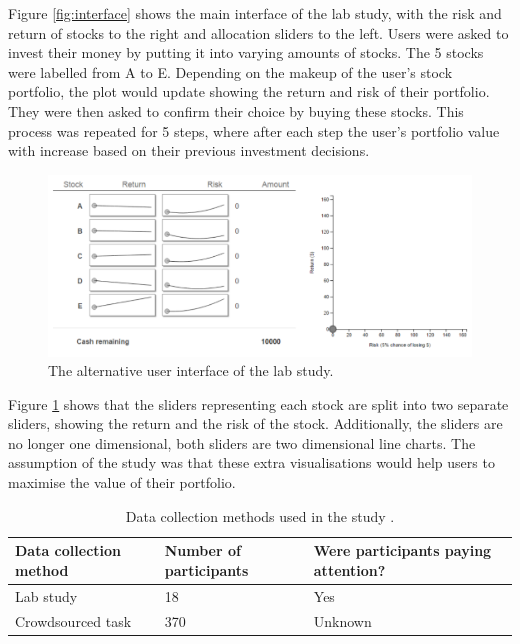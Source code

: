 \documentclass{article}
\begin{document}
Figure \ref{fig:interface} shows the main interface of the lab study, with the risk and return of stocks to the right and allocation sliders to the left.
Users were asked to invest their money by putting it into varying amounts of stocks.
The 5 stocks were labelled from A to E.
Depending on the makeup of the user's stock portfolio, the plot would update showing the return and risk of their portfolio.
They were then asked to confirm their choice by buying these stocks.
This process was repeated for 5 steps, where after each step the user's portfolio value with increase based on their previous investment decisions. 

\begin{figure}[ht]
    \centering
    \includegraphics[scale=0.45, frame]{Images/interfaceSA.png}
    \caption{The alternative user interface of the lab study.}
    \label{fig:interfaceSA}
\end{figure}

Figure \ref{fig:interfaceSA} shows that the sliders representing each stock are split into two separate sliders, showing the return and the risk of the stock.
Additionally, the sliders are no longer one dimensional, both sliders are two dimensional line charts.
The assumption of the study was that these extra visualisations would help users to maximise the value of their portfolio.

\begin{table}[ht]
    \caption{\label{table:studies} Data collection methods used in the study \cite{gruber2017thesis}.}
    \small
    \begin{tabular}{lll}
        \hline
        Data collection method & Number of participants & Were participants paying attention? \\    \hline
        Lab study              & 18                     & Yes                                 \\
        Crowdsourced task      & 370                    & Unknown                             \\    \hline
    \end{tabular}
\end{table}
\end{document}
